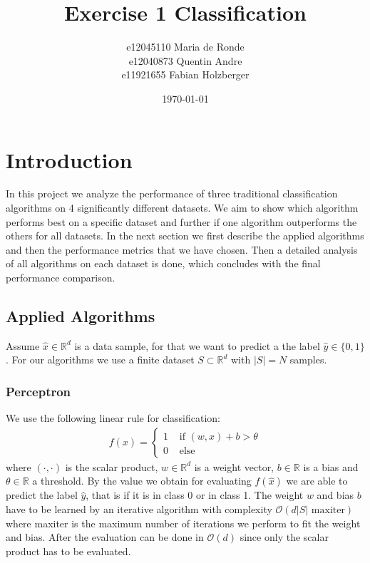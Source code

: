 \documentclass[11pt]{article}
\title{Exercise 1 Classification}
\author{e12045110 Maria de Ronde \\ e12040873  Quentin Andre  \\ e11921655 Fabian Holzberger}
\date{\today}
\begin{document}
\graphicspath{{./figures/}}
\maketitle

%
\section{Introduction}
In this project we analyze the performance of three traditional classification algorithms on 4 significantly different datasets. We aim to show which algorithm performs best on a specific dataset and further if one algorithm outperforms the others for all datasets. In the next section we first describe the applied algorithms and then the performance metrics that we have chosen. Then a detailed analysis of all algorithms on each dataset is done, which concludes with the final performance comparison.

\subsection{Applied Algorithms}
Assume $\hat{x}\in \mathbb{R}^d$ is a data sample, for that we want to predict a the label $\hat{y}\in \{0,1\}$. For our algorithms we use a finite dataset $S\subset \mathbb{R}^d$ with $|S|=N$ samples.


\subsubsection{Perceptron}\cite{shalev2014}
We use the following linear rule for classification:
\begin{align}
f(x) = 
\begin{cases}
1 & \text{ if } (w,x) +b > \theta\\
0 & \text{ else}
\end{cases}
\end{align}
where $(\cdot,\cdot)$ is the scalar product, $w\in \mathbb{R}^d$ is a weight vector, $b\in\mathbb{R}$ is a bias and $\theta \in \mathbb{R}$ a threshold. By the value we obtain for evaluating $f(\hat{x})$ we are able to predict the label $\hat{y}$, that is if it is in class 0 or in class 1. The weight $w$ and bias $b$ have to be learned by an iterative algorithm with complexity $\mathcal{O}(d |S| \text{ maxiter})$ where maxiter is the maximum number of iterations we perform to fit the weight and bias. After the evaluation can be done in $\mathcal{O}(d)$ since only the scalar product has to be evaluated.
\end{document}
